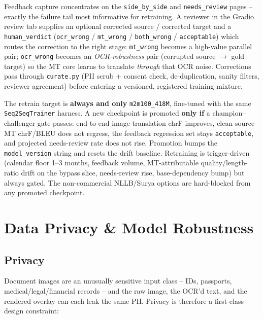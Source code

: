 \documentclass[12pt,a4paper]{article}
\begin{document}
Feedback capture concentrates on the \texttt{side\_by\_side} and \texttt{needs\_review} pages -- exactly the failure tail most informative for retraining. A reviewer in the Gradio review tab supplies an optional corrected source / corrected target and a \texttt{human\_verdict} (\texttt{ocr\_wrong} / \texttt{mt\_wrong} / \texttt{both\_wrong} / \texttt{acceptable}) which routes the correction to the right stage: \texttt{mt\_wrong} becomes a high-value parallel pair; \texttt{ocr\_wrong} becomes an \emph{OCR-robustness} pair (corrupted source $\rightarrow$ gold target) so the MT core learns to translate \emph{through} that OCR noise. Corrections pass through \texttt{curate.py} (PII scrub + consent check, de-duplication, sanity filters, reviewer agreement) before entering a versioned, registered training mixture.

The retrain target is \textbf{always and only} \texttt{m2m100\_418M}, fine-tuned with the same \texttt{Seq2SeqTrainer} harness. A new checkpoint is promoted \textbf{only if} a champion--challenger gate passes: end-to-end image-translation chrF improves, clean-source MT chrF/BLEU does not regress, the feedback regression set stays \texttt{acceptable}, and projected needs-review rate does not rise. Promotion bumps the \texttt{model\_version} string and resets the drift baseline. Retraining is trigger-driven (calendar floor 1--3 months, feedback volume, MT-attributable quality/length-ratio drift on the bypass slice, needs-review rise, base-dependency bump) but always gated. The non-commercial NLLB/Surya options are hard-blocked from any promoted checkpoint.

\section{Data Privacy \& Model Robustness}

\subsection{Privacy}

Document images are an unusually sensitive input class -- IDs, passports, medical/legal/financial records -- and the raw image, the OCR'd text, and the rendered overlay can each leak the same PII. Privacy is therefore a first-class design constraint:
\end{document}
